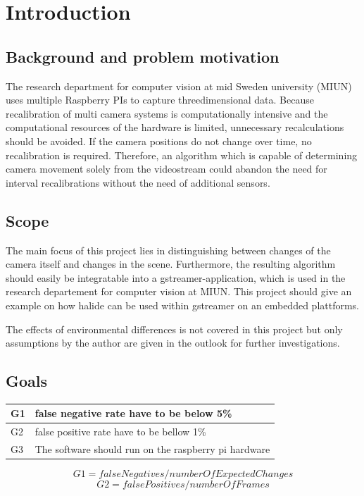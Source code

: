 \chapter{Introduction}
\section{Background and problem motivation}
The research department for computer vision at mid Sweden university (MIUN) uses multiple Raspberry PIs to capture threedimensional data. Because recalibration of multi camera systems is computationally intensive and the computational resources of the hardware is limited, unnecessary recalculations should be avoided. If the camera positions do not change over time, no recalibration is required. Therefore, an algorithm which is capable of determining camera movement solely from the videostream could abandon the need for interval recalibrations without the need of additional sensors.

\section{Scope}
The main focus of this project lies in distinguishing between changes of the camera itself and changes in the scene. Furthermore, the resulting algorithm should easily be integratable into a gstreamer-application, which is used in the research departement for computer vision at MIUN. This project should give an example on how halide can be used within gstreamer on an embedded plattforms.

The effects of environmental differences is not covered in this project but only assumptions by the author are given in the outlook for further investigations.

\section{Goals}
\begin{tabular}{|l|p{13cm}|}
	\hline G1 & false negative rate have to be below 5\% \\ 	
	\hline G2 & false positive rate have to be bellow 1\% \\ 	
	\hline G3 & The software should run on the raspberry pi hardware \\
	\hline 
\end{tabular} 
$$ G1= \mathit{falseNegatives} / \mathit{numberOfExpectedChanges} $$
$$ G2= \mathit{falsePositives} / \mathit{numberOfFrames} $$

